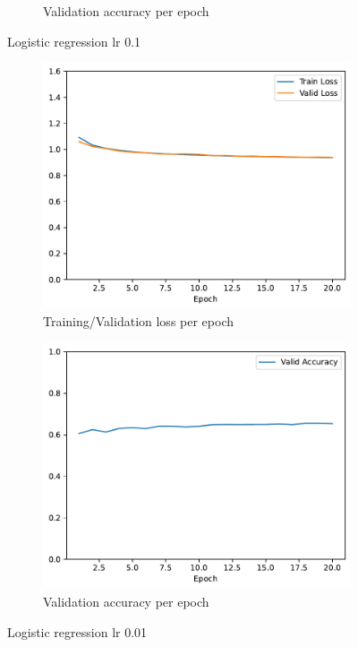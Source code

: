 \documentclass[11pt]{article}
\begin{document}
\begin{figure}
\begin{subfigure}{.5\textwidth}
  \caption{Validation accuracy per epoch}
\end{subfigure}
\caption{Logistic regression lr 0.1}
\label{fig:regression_lr_0.1}
\end{figure}

\begin{figure}
\centering
\begin{subfigure}{.5\textwidth}
  \centering
  \includegraphics[width=.9\linewidth]{plots/logistic_regression-training-loss-batch-16-lr-0.01-epochs-20-l2-0-opt-sgd}
  \caption{Training/Validation loss per epoch}
\end{subfigure}%
\begin{subfigure}{.5\textwidth}
  \centering
  \includegraphics[width=.9\linewidth]{plots/logistic_regression-validation-accuracy-batch-16-lr-0.01-epochs-20-l2-0-opt-sgd}
  \caption{Validation accuracy per epoch}
\end{subfigure}
\caption{Logistic regression lr 0.01}
\label{fig:regression_lr_0.01}
\end{figure}
\end{document}
